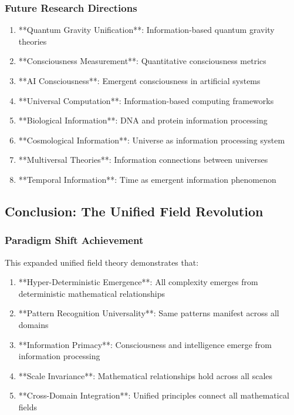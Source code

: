 \subsubsection{Future Research Directions}

\begin{enumerate}
    \item **Quantum Gravity Unification**: Information-based quantum gravity theories
    \item **Consciousness Measurement**: Quantitative consciousness metrics
    \item **AI Consciousness**: Emergent consciousness in artificial systems
    \item **Universal Computation**: Information-based computing frameworks
    \item **Biological Information**: DNA and protein information processing
    \item **Cosmological Information**: Universe as information processing system
    \item **Multiversal Theories**: Information connections between universes
    \item **Temporal Information**: Time as emergent information phenomenon
\end{enumerate}

\subsection{Conclusion: The Unified Field Revolution}

\subsubsection{Paradigm Shift Achievement}

This expanded unified field theory demonstrates that:

\begin{enumerate}
    \item **Hyper-Deterministic Emergence**: All complexity emerges from deterministic mathematical relationships
    \item **Pattern Recognition Universality**: Same patterns manifest across all domains
    \item **Information Primacy**: Consciousness and intelligence emerge from information processing
    \item **Scale Invariance**: Mathematical relationships hold across all scales
    \item **Cross-Domain Integration**: Unified principles connect all mathematical fields
\end{enumerate}

